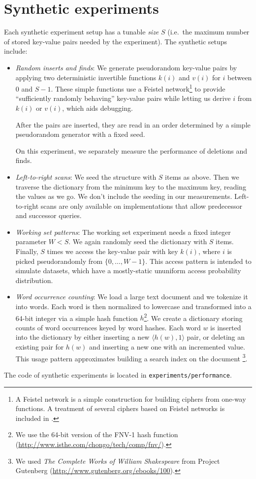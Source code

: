 \section{Synthetic experiments}
Each synthetic experiment setup has a tunable \emph{size} $S$
(i.e.\ the maximum number of stored key-value pairs needed by the experiment).
The synthetic setups include:
\begin{itemize}
\item
	\emph{Random inserts and finds}: We generate pseudorandom key-value
	pairs by applying two deterministic invertible functions $k(i)$
	and $v(i)$ for $i$ between 0 and $S-1$.
	These simple functions use a Feistel network\footnote{
		A Feistel network is a simple construction for building
		ciphers from one-way functions. A treatment of several ciphers
		based on Feistel networks is included in
		\cite{applied-cryptography}.
	} to provide
	``sufficiently randomly behaving'' key-value pairs while letting us
	derive $i$ from $k(i)$ or $v(i)$, which aids debugging.

	After the pairs are inserted, they are read in an order determined
	by a simple pseudorandom generator with a fixed seed.

	On this experiment, we separately measure the performance of deletions
	and finds.

\item
	\emph{Left-to-right scans}: We seed the structure with $S$ items
	as above. Then we traverse the dictionary from the minimum key to
	the maximum key, reading the values as we go. We don't include
	the seeding in our measurements.
	Left-to-right scans are only available on implementations that
	allow predecessor and successor queries.

\item
	\emph{Working set patterns}: The working set experiment needs
	a fixed integer parameter $W<S$. We again randomly seed the dictionary
	with $S$ items. Finally, $S$ times we access the key-value pair
	with key $k(i)$, where $i$ is picked pseudorandomly from
	$\{0,\ldots,W-1\}$.
	This access pattern is intended to simulate datasets, which have
	a mostly-static ununiform access probability distribution.

\item
	\emph{Word occurrence counting}: We load a large text document
	and we tokenize it into words. Each word is then normalized
	to lowercase and transformed into a 64-bit integer via a simple
	hash function $h$\footnote{
		We use the 64-bit version of the FNV-1 hash function
		(\url{http://www.isthe.com/chongo/tech/comp/fnv/}).
	}. We create a dictionary storing counts of word
	occurrences keyed by word hashes. Each word $w$ is inserted into
	the dictionary by either inserting a new $\langle h(w), 1\rangle$ pair,
	or deleting an existing pair for $h(w)$ and inserting a new one
	with an incremented value.
	This usage pattern approximates building a search index on the document
	\footnote{
		We used \emph{The Complete Works of William Shakespeare}
		from Project Gutenberg
		(\url{http://www.gutenberg.org/ebooks/100}).
	}.
\end{itemize}
The code of synthetic experiments is located in \texttt{experiments/performance}.

